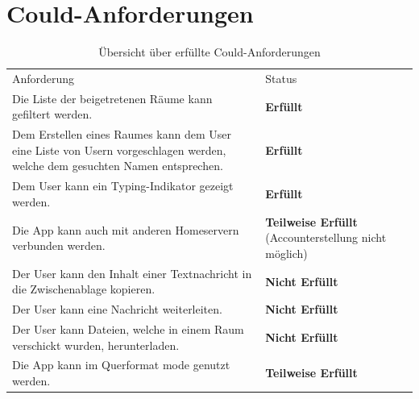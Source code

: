     \section{Could-Anforderungen}\label{sec:could-anforderungen}
    \begin{table}[h]
        \centering
        \begin{tabular}{p{}|p{}}
            Anforderung & Status\\
            \cline{1-2}
            Die Liste der beigetretenen Räume kann gefiltert werden. &  \textbf{Erfüllt} \\
            \cline{1-2}
            Dem Erstellen eines Raumes kann dem User eine Liste von Usern vorgeschlagen werden, welche dem gesuchten Namen entsprechen. & \textbf{Erfüllt}  \\
            \cline{1-2}
            Dem User kann ein Typing-Indikator gezeigt werden. &  \textbf{Erfüllt} \\
            \cline{1-2}
            Die App kann auch mit anderen Homeservern verbunden werden. & \textbf{Teilweise Erfüllt} (Accounterstellung nicht möglich)\\
            \cline{1-2}
            Der User kann den Inhalt einer Textnachricht in die Zwischenablage kopieren. & \textbf{Nicht Erfüllt} \\
            \cline{1-2}
            Der User kann eine Nachricht weiterleiten. & \textbf{Nicht Erfüllt}  \\
            \cline{1-2}
            Der User kann Dateien, welche in einem Raum verschickt wurden, herunterladen. & \textbf{Nicht Erfüllt}  \\
            \cline{1-2}
            Die App kann im Querformat mode genutzt werden. & \textbf{Teilweise Erfüllt}
        \end{tabular}
        \caption{Übersicht über erfüllte Could-Anforderungen}
        \label{tab:erfüllte-could-anforderungen}
    \end{table}


